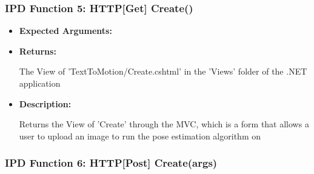 \documentclass{scrreprt}
\begin{document}
\subsubsection{IPD Function 5: HTTP[Get] Create()}

\begin{itemize}
        \item \textbf{Expected Arguments:}
        \item \textbf{Returns:}

                The View of 'TextToMotion/Create.cshtml' in the 'Views' folder of the .NET
                application

        \item \textbf{Description:}

                Returns the View of 'Create' through the MVC, which is a form that allows a
                user to upload an image to run the pose estimation algorithm on
\end{itemize}



\subsubsection{IPD Function 6: HTTP[Post] Create(args)}
\end{document}
